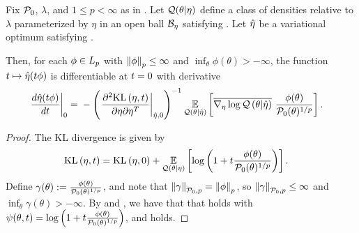 
\begin{thm}
%
Fix $\mathcal{P}_{0}$, $\lambda$, and $1 \le p < \infty$ as in .
Let $\mathcal{Q}(\theta \vert \eta)$ define a class of densities relative to $\lambda$
parameterized by $\eta$ in an open ball $\mathcal{B}_\eta$ satisfying
.  Let $\hat\eta$ be a variational optimum satisfying
.

Then, for each $\phi \in {L_{p}}$ with $\left\Vert\phi\right\Vert_p \le \infty$ and
$\inf_\theta \phi(\theta) > -\infty$, the function $t \mapsto \hat\eta(t \phi)$
is differentiable at $t = 0$ with derivative
%
\begin{align*}
%
\fracat{d \etaopt(\t \phi)}{d \t}{0} ={}&
    - \left( \fracat{\partial^2 \KL{\eta, \t}}
                    {\partial \eta \partial \eta^T}
                    {\etaopt, 0} \right)^{-1}
    \expect{\q(\theta \vert \etaopt)}{
        \lqgradbar{\theta \vert \etaopt}
        \frac{\phi(\theta)}{\pbase(\theta)^{1/p}}
    }.
%
\end{align*}
%
\begin{proof}
%
The KL divergence is given by
%
\begin{align*}
%
\KL{\eta, \t} ={}&
    \KL{\eta, 0} +
    \expect{\q(\theta \vert \eta)}
           {\log \left(1 + \t \frac{\phi(\theta)}{\pbase(\theta)^{1/p}} \right)}.
%
\end{align*}
%
Define $\gamma(\theta) := \frac{\phi(\theta)}{\mathcal{P}_{0}(\theta)^{1/p}}$, and note
that $\left\Vert\gamma\right\Vert_{\mathcal{P}_{0}, p} = \left\Vert\phi\right\Vert_{p}$, so $\left\Vert\gamma\right\Vert_{\mathcal{P}_{0},
p} \le \infty$ and $\inf_\theta \gamma(\theta) > -\infty$.  By
 and , we have that that
 holds with $\psi(\theta, t) = \log \left(1 + t
\frac{\phi(\theta)}{\mathcal{P}_{0}(\theta)^{1/p}}\right)$, and 
holds.
%
\end{proof}
%
\end{thm}
